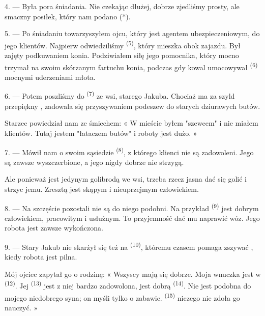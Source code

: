 4. --- Była pora śniadania. Nie czekając dłużej, dobrze zjedliśmy prosty, ale smaczny
posiłek, który nam podano (*).

\VUsaut{3.0mm}

5. --- Po śniadaniu towarzyszyłem ojcu, który jest agentem ubezpieczeniowym, do jego
klientów. Najpierw odwiedziliśmy  \textsuperscript{(5)}, który mieszka
obok zajazdu. Był zajęty podkuwaniem konia. Podziwiałem siłę jego pomocnika, który mocno
trzymał na swoim skórzanym fartuchu  konia, podczas gdy kowal umocowywał
 \textsuperscript{(6)} mocnymi uderzeniami młota.

6. --- Potem poszliśmy do  \textsuperscript{(7)} ze wsi, starego Jakuba.
Chociaż ma za szyld przepiękny , zadowala się przyszywaniem podeszew do
starych dziurawych butów.

Starzec powiedział nam ze śmiechem: « W mieście byłem "szewcem" i nie miałem klientów.
Tutaj jestem "łataczem butów" i roboty jest dużo. »

7. --- Mówił nam o swoim sąsiedzie  \textsuperscript{(8)}, z którego
klienci nie są zadowoleni. Jego  są zawsze wyszczerbione, a jego
 nigdy dobrze nie strzygą.

Ale ponieważ jest jedynym golibrodą we wsi, trzeba rzecz jasna dać się golić i strzyc
jemu. Zresztą jest skąpym i nieuprzejmym człowiekiem.

8. --- Na szczęście pozostali  nie są do niego podobni. Na przykład
 \textsuperscript{(9)} jest dobrym człowiekiem, pracowitym i
usłużnym. To przyjemność dać mu naprawić wóz. Jego robota jest zawsze wykończona.

9. --- Stary Jakub nie skarżył się też na  \textsuperscript{(10)},
któremu czasem pomaga zszywać , kiedy robota jest pilna.

Mój ojciec zapytał go o rodzinę: « Wszyscy mają się dobrze. Moja wnuczka jest w
 \textsuperscript{(12)}. Jej  \textsuperscript{(13)}
jest z niej bardzo zadowolona, jest dobrą  \textsuperscript{(14)}. Nie
jest podobna do mojego niedobrego syna; on myśli tylko o zabawie. 
\textsuperscript{(15)} niczego nie zdoła go nauczyć. »

